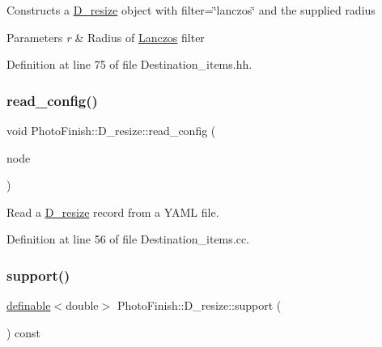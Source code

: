Constructs a \hyperlink{class_photo_finish_1_1_d__resize}{D\+\_\+resize} object with filter=\char`\"{}lanczos\char`\"{} and the supplied radius 
\begin{DoxyParams}{Parameters}
{\em r} & Radius of \hyperlink{class_photo_finish_1_1_lanczos}{Lanczos} filter \\
\hline
\end{DoxyParams}


Definition at line 75 of file Destination\+\_\+items.\+hh.

\mbox{\label{class_photo_finish_1_1_d__resize_a57239d56c851a844ba7266d39b81eefc}} 
\subsubsection{\texorpdfstring{read\+\_\+config()}{read\_config()}}
{\footnotesize\ttfamily void Photo\+Finish\+::\+D\+\_\+resize\+::read\+\_\+config (\begin{DoxyParamCaption}\item[{const Y\+A\+M\+L\+::\+Node \&}]{node }\end{DoxyParamCaption})}



Read a \hyperlink{class_photo_finish_1_1_d__resize}{D\+\_\+resize} record from a Y\+A\+ML file. 



Definition at line 56 of file Destination\+\_\+items.\+cc.

\mbox{\label{class_photo_finish_1_1_d__resize_a26e24da15f4e3a0b79117f54e0bc2983}} 
\subsubsection{\texorpdfstring{support()}{support()}}
{\footnotesize\ttfamily \hyperlink{class_photo_finish_1_1definable}{definable}$<$double$>$ Photo\+Finish\+::\+D\+\_\+resize\+::support (\begin{DoxyParamCaption}\item[{void}]{ }\end{DoxyParamCaption}) const\hspace{0.3cm}{\ttfamily [inline]}}



